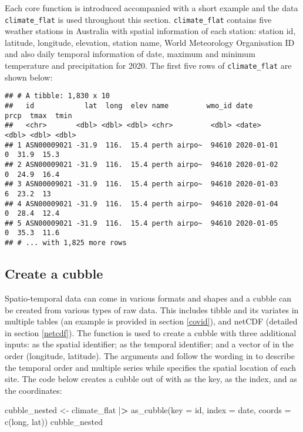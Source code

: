 \documentclass{article}
\newenvironment{Shaded}{\begin{snugshade}}{\end{snugshade}}
\newcommand{\AttributeTok}[1]{\textcolor[rgb]{0.77,0.63,0.00}{#1}}
\newcommand{\ErrorTok}[1]{\textcolor[rgb]{0.64,0.00,0.00}{\textbf{#1}}}
\newcommand{\FunctionTok}[1]{\textcolor[rgb]{0.00,0.00,0.00}{#1}}
\newcommand{\NormalTok}[1]{#1}
\newcommand{\OtherTok}[1]{\textcolor[rgb]{0.56,0.35,0.01}{#1}}
\newcommand{\SpecialCharTok}[1]{\textcolor[rgb]{0.00,0.00,0.00}{#1}}
\begin{document}
Each core function is introduced accompanied with a short example and the data \texttt{climate\_flat} is used throughout this section. \texttt{climate\_flat} contains five weather stations in Australia with spatial information of each station: station id, latitude, longitude, elevation, station name, World Meteorology Organisation ID and also daily temporal information of date, maximum and minimum temperature and precipitation for 2020. The first five rows of \texttt{climate\_flat} are shown below:

\begin{verbatim}
## # A tibble: 1,830 x 10
##   id            lat  long  elev name         wmo_id date        prcp  tmax  tmin
##   <chr>       <dbl> <dbl> <dbl> <chr>         <dbl> <date>     <dbl> <dbl> <dbl>
## 1 ASN00009021 -31.9  116.  15.4 perth airpo~  94610 2020-01-01     0  31.9  15.3
## 2 ASN00009021 -31.9  116.  15.4 perth airpo~  94610 2020-01-02     0  24.9  16.4
## 3 ASN00009021 -31.9  116.  15.4 perth airpo~  94610 2020-01-03     6  23.2  13  
## 4 ASN00009021 -31.9  116.  15.4 perth airpo~  94610 2020-01-04     0  28.4  12.4
## 5 ASN00009021 -31.9  116.  15.4 perth airpo~  94610 2020-01-05     0  35.3  11.6
## # ... with 1,825 more rows
\end{verbatim}

\hypertarget{create}{%
\subsection{Create a cubble}\label{create}}

Spatio-temporal data can come in various formats and shapes and a cubble can be created from various types of raw data. This includes tibble and its variates in multiple tables (an example is provided in section \ref{covid}), and netCDF (detailed in section \ref{netcdf}). The function  is used to create a cubble with three additional inputs:  as the spatial identifier;  as the temporal identifier; and a vector of  in the order (longitude, latitude). The arguments  and  follow the wording in  to describe the temporal order and multiple series while  specifies the spatial location of each site. The code below creates a cubble out of  with  as the key,  as the index, and  as the coordinates:

\begin{Shaded}
\begin{Highlighting}[]
\NormalTok{cubble\_nested }\OtherTok{\textless{}{-}}\NormalTok{ climate\_flat }\SpecialCharTok{|}\ErrorTok{\textgreater{}}
  \FunctionTok{as\_cubble}\NormalTok{(}\AttributeTok{key =}\NormalTok{ id, }\AttributeTok{index =}\NormalTok{ date, }\AttributeTok{coords =} \FunctionTok{c}\NormalTok{(long, lat))}
\NormalTok{cubble\_nested}
\end{Highlighting}
\end{Shaded}
\end{document}
